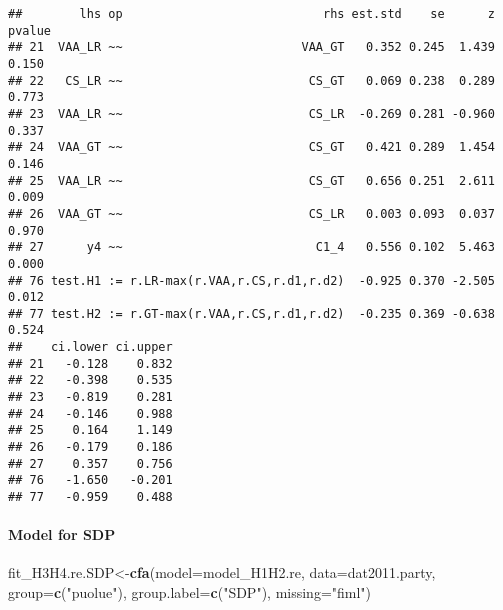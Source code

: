 \documentclass[
]{article}
\newenvironment{Shaded}{\begin{snugshade}}{\end{snugshade}}
\newcommand{\DataTypeTok}[1]{\textcolor[rgb]{0.13,0.29,0.53}{#1}}
\newcommand{\KeywordTok}[1]{\textcolor[rgb]{0.13,0.29,0.53}{\textbf{#1}}}
\newcommand{\NormalTok}[1]{#1}
\newcommand{\OperatorTok}[1]{\textcolor[rgb]{0.81,0.36,0.00}{\textbf{#1}}}
\newcommand{\StringTok}[1]{\textcolor[rgb]{0.31,0.60,0.02}{#1}}
\begin{document}
\begin{Shaded}
\end{Shaded}

\begin{verbatim}
##        lhs op                            rhs est.std    se      z pvalue
## 21  VAA_LR ~~                         VAA_GT   0.352 0.245  1.439  0.150
## 22   CS_LR ~~                          CS_GT   0.069 0.238  0.289  0.773
## 23  VAA_LR ~~                          CS_LR  -0.269 0.281 -0.960  0.337
## 24  VAA_GT ~~                          CS_GT   0.421 0.289  1.454  0.146
## 25  VAA_LR ~~                          CS_GT   0.656 0.251  2.611  0.009
## 26  VAA_GT ~~                          CS_LR   0.003 0.093  0.037  0.970
## 27      y4 ~~                           C1_4   0.556 0.102  5.463  0.000
## 76 test.H1 := r.LR-max(r.VAA,r.CS,r.d1,r.d2)  -0.925 0.370 -2.505  0.012
## 77 test.H2 := r.GT-max(r.VAA,r.CS,r.d1,r.d2)  -0.235 0.369 -0.638  0.524
##    ci.lower ci.upper
## 21   -0.128    0.832
## 22   -0.398    0.535
## 23   -0.819    0.281
## 24   -0.146    0.988
## 25    0.164    1.149
## 26   -0.179    0.186
## 27    0.357    0.756
## 76   -1.650   -0.201
## 77   -0.959    0.488
\end{verbatim}

\newpage

\hypertarget{model-for-sdp}{%
\paragraph{Model for SDP}\label{model-for-sdp}}

\begin{Shaded}
\begin{Highlighting}[]
\NormalTok{fit_H3H4.re.SDP<-}\KeywordTok{cfa}\NormalTok{(}\DataTypeTok{model=}\NormalTok{model_H1H2.re,}
                    \DataTypeTok{data=}\NormalTok{dat2011.party,}
                    \DataTypeTok{group=}\KeywordTok{c}\NormalTok{(}\StringTok{"puolue"}\NormalTok{),}
                    \DataTypeTok{group.label=}\KeywordTok{c}\NormalTok{(}\StringTok{"SDP"}\NormalTok{),}
                    \DataTypeTok{missing=}\StringTok{"fiml"}\NormalTok{)}
\end{Highlighting}
\end{Shaded}
\end{document}
